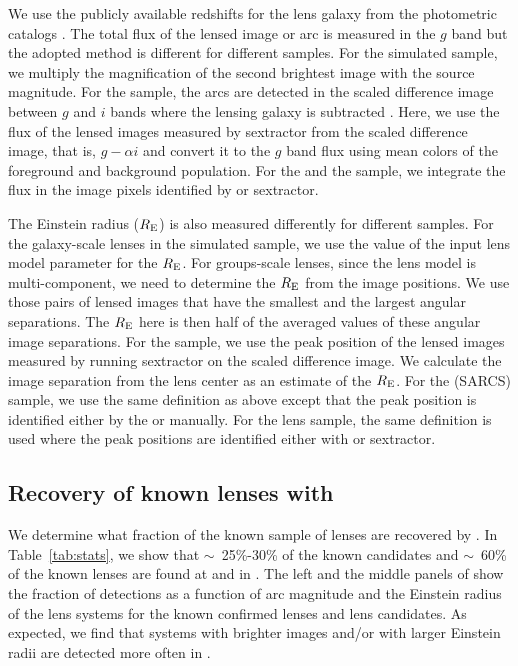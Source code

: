 \documentclass[useAMS,usenatbib,a4paper]{mn2e}
\begin{document}
We use the publicly available redshifts for the lens galaxy from the
\cfhtls photometric catalogs \citep{Coupon2009}. The total flux of the
lensed image or arc is measured in the $g$ band but the adopted method
is different for different samples. For the simulated sample, we
multiply the magnification of the second brightest image with the source
magnitude. For the \rf sample, the arcs are detected in the scaled
difference image between $g$ and $i$ bands where the lensing galaxy is
subtracted \citep[for details, see]{Gavazzi2014}. Here, we use the flux
of the lensed images measured by {\sc sextractor} from the scaled
difference image, that is, $g-\alpha i$ and convert it to the $g$ band
flux using mean colors of the foreground and background population. For
the \af and the \sw sample, we integrate the flux in the image pixels
identified by \af or {\sc sextractor}.


The Einstein radius ($R_{\rm E}$) is also measured differently for
different samples. For the galaxy-scale lenses in the simulated sample,
we use the value of the input lens model parameter for the $R_{\rm E}$.
For groups-scale lenses, since the lens model is multi-component, we
need to determine the $R_{\rm E}$ from the image positions. We use those
pairs of lensed images that have the smallest and the largest angular
separations. The $R_{\rm E}$ here is then half of the averaged values of
these angular image separations.  For the \rf sample, we use the peak
position of the lensed images measured by running {\sc sextractor} on
the scaled difference image. We calculate the image separation from the
lens center as an estimate of the $R_{\rm E}$. For the \af (SARCS)
sample, we use the same definition as above except that the peak
position is identified either by the \af or manually. For the \sw lens
sample, the same definition is used where the peak positions are
identified either with \af or {\sc sextractor}.



\subsection{Recovery of known \cfhtls lenses with \sw}
\label{sec:results:known}

We determine what fraction of the known sample of lenses are recovered
by \sw. In Table~\ref{tab:stats}, we show that $\sim$~25\%-30\% of the
known candidates and $\sim$~60\% of the known lenses are found at \StageOne and \StageTwo in \sw. The left and the middle panels of 
show the fraction of detections as a function of arc magnitude and the
Einstein radius of the lens systems for the known confirmed lenses and
lens candidates. As expected, we find that systems with brighter images
and/or with larger Einstein radii are detected more often in \sw.
\end{document}
